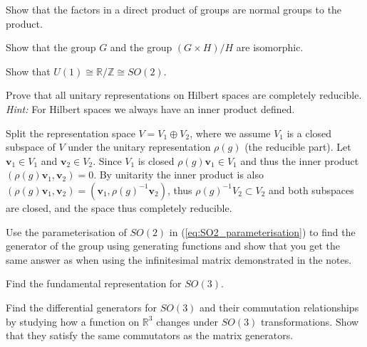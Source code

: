 \documentclass[notes.tex]{subfiles}
\begin{document}
\begin{Exercise}[]
Show that the factors in a direct product of groups are normal groups to the product.
\end{Exercise}

\begin{Exercise}[]
Show that the group $G$ and the group $(G\times H) / H$ are isomorphic.
\end{Exercise}


\begin{Exercise}[]
Show that $U(1)\cong\mathbb{R}/\mathbb{Z}\cong SO(2)$.
\end{Exercise}


\begin{Exercise}[difficulty={2}]
Prove that all unitary representations on Hilbert spaces are completely reducible. {\it Hint:} For Hilbert spaces we always have an inner product defined.
\end{Exercise}
\begin{Answer}
Split the representation space $V=V_1\oplus V_2$, where we assume $V_1$ is a closed subspace of $V$ under the unitary representation $\rho(g)$ (the reducible part). Let $\mathbf v_1\in V_1$ and $\mathbf v_2\in V_2$.  Since $V_1$ is closed $\rho(g)\mathbf v_1 \in V_1$ and thus the inner product $(\rho(g)\mathbf v_1,  \mathbf v_2)=0$.  By unitarity the inner product is also $(\rho(g)\mathbf v_1,  \mathbf v_2)=(\mathbf v_1, \rho(g)^{-1}\mathbf v_2)$, thus $\rho(g)^{-1}V_2 \subset V_2$ and both subspaces are closed, and the space thus completely reducible. 
\end{Answer}


\begin{Exercise}[difficulty={1}]
Use the parameterisation of $SO(2)$ in (\ref{eq:SO2_parameterisation}) to find the generator of the group using generating functions and show that you get the same answer as when using the infinitesimal matrix demonstrated in the notes.
\end{Exercise}


\begin{Exercise}[]
Find the fundamental representation for $SO(3)$.
\end{Exercise}


\begin{Exercise}[difficulty={3},label=ex:SO2_diff_generators]
Find the differential generators for $SO(3)$ and their commutation relationships by studying how a function on $\mathbb R^3$ changes under $SO(3)$ transformations. Show that they satisfy the same commutators as the matrix generators.
\end{Exercise}
\end{document}
